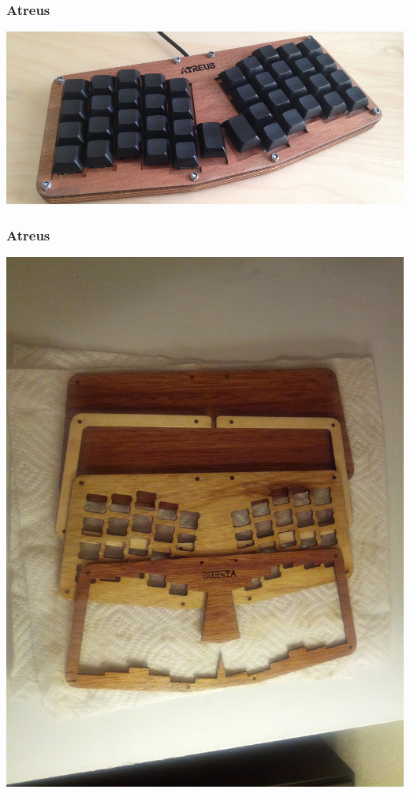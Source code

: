 \documentclass{beamer}
\begin{document}
\begin{frame}
  \frametitle{Atreus}
  \includegraphics[scale=0.3]{images/atreus}
\end{frame}

\begin{frame}
  \frametitle{Atreus}
  \includegraphics[scale=0.1]{images/atreus-body}
\end{frame}
\end{document}
